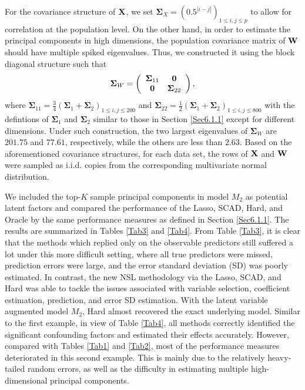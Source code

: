 \documentclass{statsoc}
\newcommand{\bW}{\mbox{\bf W}}
\newcommand{\bX}{\mbox{\bf X}}
\newcommand{\bzero}{\mbox{\bf 0}}
\newcommand{\Sig}{\mathbf{\Sigma}}
\begin{document}
For the covariance structure of $\bX$, we set $\Sig_X = (0.5^{|i-j|})_{1 \leq i, j \leq p}$ to allow for correlation at the population level. On the other hand, in order to estimate the principal components in high dimensions, the population covariance matrix of $\bW$ should have multiple spiked eigenvalues. Thus, we constructed it using the block diagonal structure such that
\[\Sig_W = \left(\begin{array}{cc} \Sig_{11} & \bzero \\ \bzero & \Sig_{22} \end{array} \right),\]
where $\Sig_{11} = \frac{3}{4} (\Sig_1 + \Sig_2)_{1 \leq i,j \leq 200}$ and $\Sig_{22} = \frac{1}{2} (\Sig_1 + \Sig_2)_{1 \leq i,j \leq 800}$ with the defintions of $\Sig_1$ and $\Sig_2$ similar to those in Section \ref{Sec6.1.1} except for different dimensions. Under such construction, the two largest eigenvalues of $\Sig_W$ are $201.75$ and $77.61$, respectively, while the others are less than $2.63$. Based on the aforementioned covariance structures, for each data set, the rows of $\bX$ and $\bW$ were sampled as i.i.d. copies from the corresponding multivariate normal distribution.

We included the top-$K$ sample principal components in model $M_2$ as potential latent factors and compared the performance of the Lasso, SCAD, Hard, and Oracle by the same performance measures as defined in Section \ref{Sec6.1.1}. The results are summarized in Tables \ref{Tab3} and \ref{Tab4}. From Table \ref{Tab3}, it is clear that the methods which replied only on the observable predictors still suffered a lot under this more difficult setting, where all true predictors were missed, prediction errors were large, and the error standard deviation (SD) was poorly estimated. In contrast, the new NSL methodology via the Lasso, SCAD, and Hard was able to tackle the issues associated with variable selection, coefficient estimation, prediction, and error SD estimation. With the latent variable augmented model $M_2$, Hard almost recovered the exact underlying model. Similar to the first example, in view of Table \ref{Tab4}, all methods correctly identified the significant confounding factors and estimated their effects accurately. However, compared with Tables  \ref{Tab1} and  \ref{Tab2}, most of the performance measures deteriorated in this second example. This is mainly due to the relatively heavy-tailed random errors, as well as the difficulty in estimating multiple high-dimensional principal components.
\end{document}
